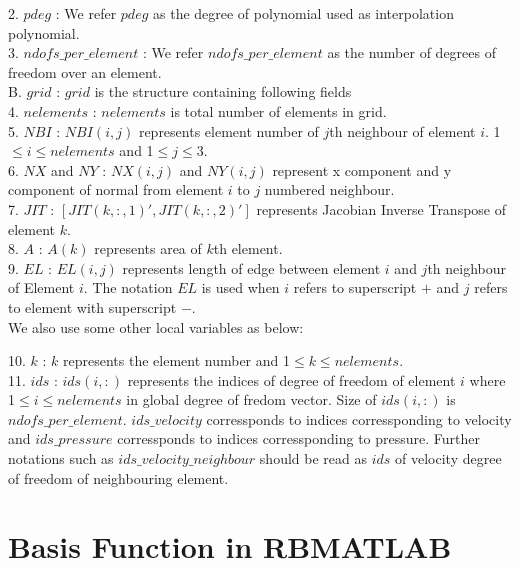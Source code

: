 \documentclass[a4paper,12pt]{book}
\begin{document}
2. $pdeg$ : We refer $pdeg$ as the degree of polynomial used as interpolation polynomial.\\

3. $ndofs\_per\_element$ : We refer $ndofs\_per\_element$ as the number of degrees of freedom over an element. \\

B. $grid$ : $grid$ is the structure containing following fields\\

4. $nelements$ : $nelements$ is total number of elements in grid.\\

5. $NBI$ : $NBI(i,j)$ represents element number of $j$th neighbour of element $i$. 1$\leq i \leq nelements$ and 1$\leq j \leq$3.\\

6. $NX$ and $NY$ : $NX(i,j)$ and $NY(i,j)$ represent x component and y component of normal from  element $i$ to $j$ numbered neighbour.\\

7. $JIT$ : $[JIT(k,:,1)',JIT(k,:,2)']$ represents Jacobian Inverse Transpose of element $k$.\\

8. $A$ : $A(k)$ represents area of $k$th element.\\

9. $EL$ : $EL(i,j)$ represents length of edge between element $i$ and $j$th neighbour of Element $i$. The notation $EL$ is used when $i$ refers to superscript $+$ and $j$ refers to element with superscript $-$.\\

We also use some other local variables as below:

10. $k$ : $k$ represents the element number and 1$\leq k \leq nelements$.\\

11. $ids$ : $ids(i,:)$ represents the indices of degree of freedom of element $i$ where 1$\leq i \leq nelements$ in global degree of fredom vector. Size of $ids(i,:)$ is $ndofs\_per\_element$. $ids\_velocity$ corressponds to indices corressponding to velocity and $ids\_pressure$ corressponds to indices corressponding to pressure. Further notations such as $ids\_velocity\_neighbour$ should be read as $ids$ of velocity degree of freedom of neighbouring element.\\

\section{Basis Function in RBMATLAB}
\end{document}
